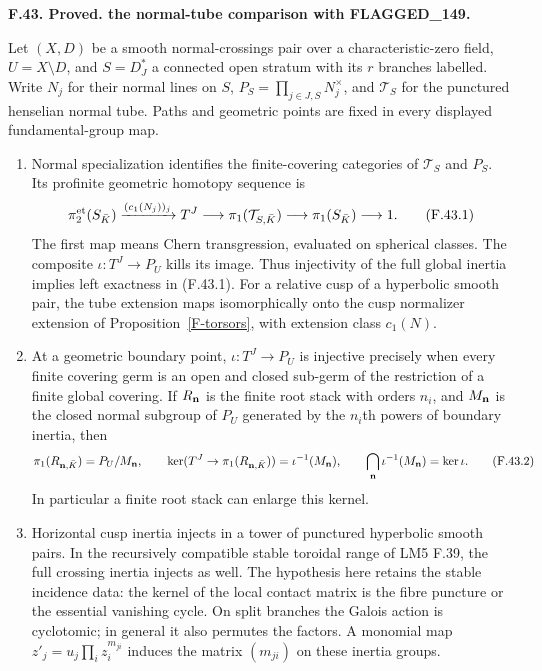 \documentclass[11pt,oneside]{article}
\makeatletter
\newcounter{statementanchor}
\newenvironment{statement}[3]{%
 \refstepcounter{statementanchor}\def\@currentlabel{#1}%
 \par\addvspace{9pt}\noindent
 \textbf{#1. #2. #3.}\par\nobreak\noindent\ignorespaces
}{\par\addvspace{5pt}}
\makeatother
\begin{document}
\begin{statement}{F.43}{Proved}{the normal-tube comparison with FLAGGED\_149}
\label{st:F.43}
\label{F-normal-tube-comparison}
Let $(X,D)$ be a smooth normal-crossings pair over a characteristic-zero
field, $U=X\setminus D$, and $S=D_J^*$ a connected open stratum with
its $r$ branches labelled. Write $N_j$ for their normal lines on $S$,
$P_S=\prod_{j\in J,S}N_j^\times$, and $\mathcal T_S$ for the
punctured henselian normal tube. Paths and geometric points are fixed
in every displayed fundamental-group map.
\begin{enumerate}
\item Normal specialization identifies the finite-covering categories
of $\mathcal T_S$ and $P_S$. Its profinite geometric homotopy sequence is
\[
 \pi_2^{\rm et}(S_{\bar K})\xrightarrow{(c_1(N_j))_j}
 T^J\longrightarrow\pi_1(\mathcal T_{S,\bar K})
 \longrightarrow\pi_1(S_{\bar K})\longrightarrow1.
 \tag{F.43.1}
\]
The first map means Chern transgression, evaluated on spherical
classes. The composite $\iota:T^J\to P_U$ kills its image. Thus
injectivity of the full global inertia implies left exactness in
(F.43.1). For a relative cusp of a hyperbolic smooth pair, the tube
extension maps isomorphically onto the cusp normalizer extension
of Proposition~\ref{F-torsors}, with extension class $c_1(N)$.

\item At a geometric boundary point, $\iota:T^J\to P_U$ is injective
precisely when every finite covering germ is an open and closed
sub-germ of the restriction of a finite global covering. If $R_{\bf n}$
is the finite root stack with orders $n_i$, and $M_{\bf n}$ is the
closed normal subgroup of $P_U$ generated by the $n_i$th powers of
boundary inertia, then
\[
 \pi_1(R_{{\bf n},\bar K})=P_U/M_{\bf n},\qquad
 \ker(T^J\to\pi_1(R_{{\bf n},\bar K}))
       =\iota^{-1}(M_{\bf n}),\qquad
 \bigcap_{\bf n}\iota^{-1}(M_{\bf n})=\ker\iota.
 \tag{F.43.2}
\]
In particular a finite root stack can enlarge this kernel.

\item Horizontal cusp inertia injects in a tower of punctured
hyperbolic smooth pairs. In the recursively compatible stable
toroidal range of LM5 F.39, the full crossing inertia injects as
well. The hypothesis here retains the stable incidence data:
the kernel of the local contact matrix is the fibre puncture
or the essential vanishing cycle. On split branches the Galois
action is cyclotomic; in general it also permutes the factors.
A monomial map $z'_j=u_j\prod_i z_i^{m_{ji}}$ induces the matrix
$(m_{ji})$ on these inertia groups.


\end{enumerate}
\end{statement}
\end{document}
